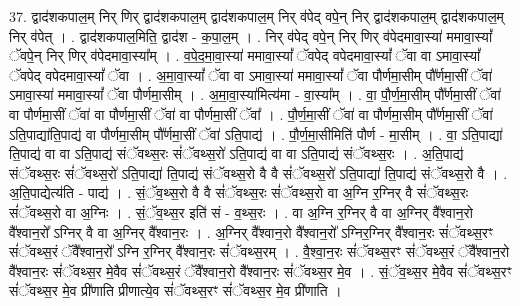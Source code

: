 \documentclass[17pt]{extarticle}
\begin{document}
37. द्वाद॑शकपाल॒म् निर् णिर् द्वाद॑शकपाल॒म् द्वाद॑शकपाल॒म् निर् व॑पेद् वपे॒न् निर् द्वाद॑शकपाल॒म् द्वाद॑शकपाल॒म् निर् व॑पेत् । . द्वाद॑शकपाल॒मिति॒ द्वाद॑श - क॒पा॒ल॒म् । . निर् व॑पेद् वपे॒न् निर् णिर् व॑पेदमावा॒स्या॑ ममावा॒स्यां᳚ ॅवपे॒न् निर् णिर् व॑पेदमावा॒स्या᳚म् । . व॒पे॒द॒मा॒वा॒स्या॑ ममावा॒स्यां᳚ ॅवपेद् वपेदमावा॒स्यां᳚ ॅवा वा ऽमावा॒स्यां᳚ ॅवपेद् वपेदमावा॒स्यां᳚ ॅवा । . अ॒मा॒वा॒स्यां᳚ ॅवा वा ऽमावा॒स्या॑ ममावा॒स्यां᳚ ॅवा पौर्णमा॒सीम् पौ᳚र्णमा॒सीं ॅवा॑ ऽमावा॒स्या॑ ममावा॒स्यां᳚ ॅवा पौर्णमा॒सीम् । . अ॒मा॒वा॒स्या॑मित्य॑मा - वा॒स्या᳚म् । . वा॒ पौ॒र्ण॒मा॒सीम् पौ᳚र्णमा॒सीं ॅवा॑ वा पौर्णमा॒सीं ॅवा॑ वा पौर्णमा॒सीं ॅवा॑ वा पौर्णमा॒सीं ॅवा᳚ । . पौ॒र्ण॒मा॒सीं ॅवा॑ वा पौर्णमा॒सीम् पौ᳚र्णमा॒सीं ॅवा॑ ऽति॒पाद्या॑ति॒पाद्य॑ वा पौर्णमा॒सीम् पौ᳚र्णमा॒सीं ॅवा॑ ऽति॒पाद्य॑ । . पौ॒र्ण॒मा॒सीमिति॑ पौर्ण - मा॒सीम् । . वा॒ ऽति॒पाद्या॑ ति॒पाद्य॑ वा वा ऽति॒पाद्य॑ संॅवथ्स॒रः सं॑ॅवथ्स॒रो॑ ऽति॒पाद्य॑ वा वा ऽति॒पाद्य॑ संॅवथ्स॒रः । . अ॒ति॒पाद्य॑ संॅवथ्स॒रः सं॑ॅवथ्स॒रो॑ ऽति॒पाद्या॑ ति॒पाद्य॑ संॅवथ्स॒रो वै वै सं॑ॅवथ्स॒रो॑ ऽति॒पाद्या॑ ति॒पाद्य॑ संॅवथ्स॒रो वै । . अ॒ति॒पाद्येत्य॑ति - पाद्य॑ । . सं॒ॅव॒थ्स॒रो वै वै सं॑ॅवथ्स॒रः सं॑ॅवथ्स॒रो वा अ॒ग्नि र॒ग्निर् वै सं॑ॅवथ्स॒रः सं॑ॅवथ्स॒रो वा अ॒ग्निः । . सं॒ॅव॒थ्स॒र इति॑ सं - व॒थ्स॒रः । . वा अ॒ग्नि र॒ग्निर् वै वा अ॒ग्निर् वै᳚श्वान॒रो वै᳚श्वान॒रो᳚ ऽग्निर् वै वा अ॒ग्निर् वै᳚श्वान॒रः । . अ॒ग्निर् वै᳚श्वान॒रो वै᳚श्वान॒रो᳚ ऽग्निर॒ग्निर् वै᳚श्वान॒रः सं॑ॅवथ्स॒रꣳ सं॑ॅवथ्स॒रं ॅवै᳚श्वान॒रो᳚ ऽग्नि र॒ग्निर् वै᳚श्वान॒रः सं॑ॅवथ्स॒रम् । . वै॒श्वा॒न॒रः सं॑ॅवथ्स॒रꣳ सं॑ॅवथ्स॒रं ॅवै᳚श्वान॒रो वै᳚श्वान॒रः सं॑ॅवथ्स॒र मे॒वैव सं॑ॅवथ्स॒रं ॅवै᳚श्वान॒रो वै᳚श्वान॒रः सं॑ॅवथ्स॒र मे॒व । . सं॒ॅव॒थ्स॒र मे॒वैव सं॑ॅवथ्स॒रꣳ सं॑ॅवथ्स॒र मे॒व प्री॑णाति प्रीणात्ये॒व सं॑ॅवथ्स॒रꣳ सं॑ॅवथ्स॒र मे॒व प्री॑णाति । \newline
\end{document}
